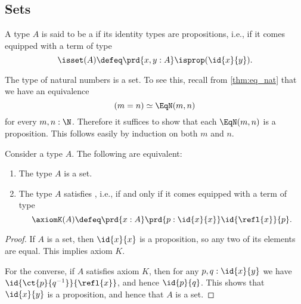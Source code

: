 \subsection{Sets}

\begin{defn}
  A type $A$ is said to be a  if its identity types are propositions, i.e., if it comes equipped with a term of type
\begin{equation*}
\isset(A)\defeq \prd{x,y:A}\isprop(\id{x}{y}).
\end{equation*}
\end{defn}

\begin{eg}\label{eg:is-set-nat}
  The type of natural numbers is a set. To see this, recall from \cref{thm:eq_nat} that we have an equivalence
  \begin{equation*}
    (m=n)\simeq \EqN(m,n)
  \end{equation*}
  for every $m,n:\N$. Therefore it suffices to show that each $\EqN(m,n)$ is a proposition. This follows easily by induction on both $m$ and $n$.
\end{eg}

\begin{prp}
  Consider a type $A$. The following are equivalent:
  \begin{enumerate}
  \item The type $A$ is a set.
  \item The type $A$ satisfies , i.e., if and only if it comes equipped with a term of type
    \begin{equation*}
      \axiomK(A)\defeq\prd{x:A}\prd{p:\id{x}{x}}\id{\refl{x}}{p}.
    \end{equation*}
  \end{enumerate}
\end{prp}

\begin{proof}
If $A$ is a set, then $\id{x}{x}$ is a proposition, so any two of its elements are equal. 
This implies axiom $K$. 

For the converse, if $A$ satisfies axiom $K$, then for any $p,q:\id{x}{y}$ we have $\id{\ct{p}{q^{-1}}}{\refl{x}}$, and hence $\id{p}{q}$. This shows that $\id{x}{y}$ is a proposition, and hence that $A$ is a set.
\end{proof}

